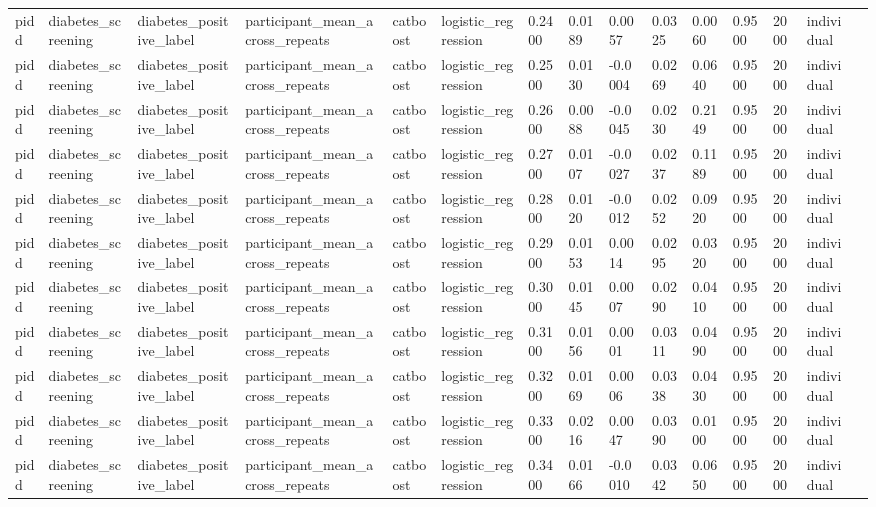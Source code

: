 \begin{tabular}{lllllllllllllll}
pidd & diabetes\_screening & diabetes\_positive\_label & participant\_mean\_across\_repeats & catboost & logistic\_regression & 0.2400 & 0.0189 & 0.0057 & 0.0325 & 0.0060 & 0.9500 & 2000 & individual &  \\
pidd & diabetes\_screening & diabetes\_positive\_label & participant\_mean\_across\_repeats & catboost & logistic\_regression & 0.2500 & 0.0130 & -0.0004 & 0.0269 & 0.0640 & 0.9500 & 2000 & individual &  \\
pidd & diabetes\_screening & diabetes\_positive\_label & participant\_mean\_across\_repeats & catboost & logistic\_regression & 0.2600 & 0.0088 & -0.0045 & 0.0230 & 0.2149 & 0.9500 & 2000 & individual &  \\
pidd & diabetes\_screening & diabetes\_positive\_label & participant\_mean\_across\_repeats & catboost & logistic\_regression & 0.2700 & 0.0107 & -0.0027 & 0.0237 & 0.1189 & 0.9500 & 2000 & individual &  \\
pidd & diabetes\_screening & diabetes\_positive\_label & participant\_mean\_across\_repeats & catboost & logistic\_regression & 0.2800 & 0.0120 & -0.0012 & 0.0252 & 0.0920 & 0.9500 & 2000 & individual &  \\
pidd & diabetes\_screening & diabetes\_positive\_label & participant\_mean\_across\_repeats & catboost & logistic\_regression & 0.2900 & 0.0153 & 0.0014 & 0.0295 & 0.0320 & 0.9500 & 2000 & individual &  \\
pidd & diabetes\_screening & diabetes\_positive\_label & participant\_mean\_across\_repeats & catboost & logistic\_regression & 0.3000 & 0.0145 & 0.0007 & 0.0290 & 0.0410 & 0.9500 & 2000 & individual &  \\
pidd & diabetes\_screening & diabetes\_positive\_label & participant\_mean\_across\_repeats & catboost & logistic\_regression & 0.3100 & 0.0156 & 0.0001 & 0.0311 & 0.0490 & 0.9500 & 2000 & individual &  \\
pidd & diabetes\_screening & diabetes\_positive\_label & participant\_mean\_across\_repeats & catboost & logistic\_regression & 0.3200 & 0.0169 & 0.0006 & 0.0338 & 0.0430 & 0.9500 & 2000 & individual &  \\
pidd & diabetes\_screening & diabetes\_positive\_label & participant\_mean\_across\_repeats & catboost & logistic\_regression & 0.3300 & 0.0216 & 0.0047 & 0.0390 & 0.0100 & 0.9500 & 2000 & individual &  \\
pidd & diabetes\_screening & diabetes\_positive\_label & participant\_mean\_across\_repeats & catboost & logistic\_regression & 0.3400 & 0.0166 & -0.0010 & 0.0342 & 0.0650 & 0.9500 & 2000 & individual &  \\

\end{tabular}
